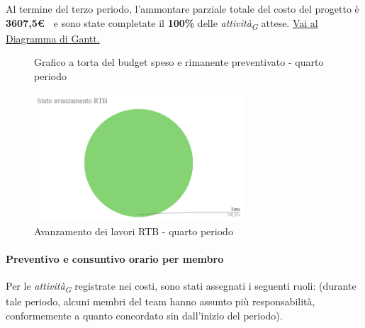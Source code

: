 Al termine del terzo periodo, l'ammontare parziale totale del costo del progetto è \textbf{ 3607,5\euro\ } e sono state completate il \textbf{100\%} delle \textit{attività}\textsubscript{\textit{G}} attese.
\href{https://github.com/orgs/ByteOps-swe/projects/3/views/1?sortedBy%5Bdirection%5D=asc&sortedBy%5BcolumnId%5D=64182560}{Vai al Diagramma di Gantt.}\hspace{1pt}


\begin{figure}[H]
    \centering
    \begin{minipage}[b]{0.45\textwidth}
        \centering
        \caption{Grafico a torta del budget speso e rimanente preventivato - quarto periodo}
        \label{fig:Budget_speso_4}
    \end{minipage}
    
    \vspace{1cm}

    \begin{minipage}[b]{0.70\textwidth}
        \centering
        \includegraphics[width=0.7\textwidth]{../Images/avanzamento4Periodo.png}
        \caption{Avanzamento dei lavori RTB - quarto periodo}
        \label{fig:Avanzamento_RTB_4}
    \end{minipage}
\end{figure}

\paragraph{Preventivo e consuntivo orario per membro} \hspace{1pt}
Per le \textit{attività}\textsubscript{\textit{G}} registrate nei costi, sono stati assegnati i seguenti ruoli: (durante tale periodo, alcuni membri del team hanno assunto più responsabilità, conformemente a quanto concordato sin dall'inizio del periodo).


